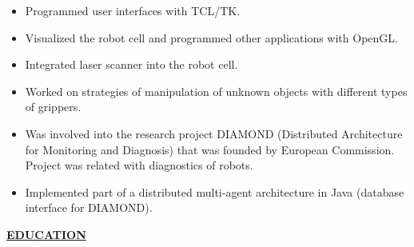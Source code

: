 \documentclass[a4paper,12pt,]{article}
\begin{document}
\begin{description}
\begin{itemize}
    \item Programmed user interfaces with TCL/TK.

    \item Visualized the robot cell and programmed other applications with OpenGL.

    \item Integrated laser scanner into the robot cell.

    \item Worked on strategies of manipulation of unknown objects with different types
      of grippers.

    \item Was involved into the research project DIAMOND (Distributed Architecture for 
      Monitoring and Diagnosis) that was
      founded by European Commission. Project was related with diagnostics of robots.

    \item Implemented part of a distributed multi-agent architecture in Java (database 
      interface for DIAMOND).

    \end{itemize}

  \end{description}

  \newpage

  \uline{ \bfseries{EDUCATION} }
\end{document}
